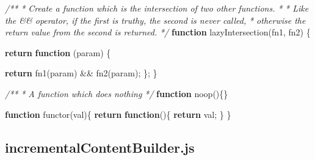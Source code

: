 \documentclass[12pt, ]{article}
\newenvironment{Shaded}{}{}
\newcommand{\KeywordTok}[1]{\textcolor[rgb]{0.00,0.44,0.13}{\textbf{{#1}}}}
\newcommand{\CommentTok}[1]{\textcolor[rgb]{0.38,0.63,0.69}{\textit{{#1}}}}
\newcommand{\FunctionTok}[1]{\textcolor[rgb]{0.02,0.16,0.49}{{#1}}}
\newcommand{\NormalTok}[1]{{#1}}
\begin{document}
\begin{Shaded}
\begin{Highlighting}[]
\CommentTok{/**}
\CommentTok{ * Create a function which is the intersection of two other functions.}
\CommentTok{ * }
\CommentTok{ * Like the && operator, if the first is truthy, the second is never called,}
\CommentTok{ * otherwise the return value from the second is returned.}
\CommentTok{ */}
\KeywordTok{function} \FunctionTok{lazyIntersection}\NormalTok{(fn1, fn2) \{}

   \KeywordTok{return} \KeywordTok{function} \NormalTok{(param) \{}
                                                              
      \KeywordTok{return} \FunctionTok{fn1}\NormalTok{(param) && }\FunctionTok{fn2}\NormalTok{(param);}
   \NormalTok{\};   }
\NormalTok{\}}

\CommentTok{/**}
\CommentTok{ * A function which does nothing}
\CommentTok{ */}
\KeywordTok{function} \FunctionTok{noop}\NormalTok{()\{\}}

\KeywordTok{function} \FunctionTok{functor}\NormalTok{(val)\{}
   \KeywordTok{return} \KeywordTok{function}\NormalTok{()\{}
      \KeywordTok{return} \NormalTok{val;}
   \NormalTok{\}}
\NormalTok{\}}
\end{Highlighting}
\end{Shaded}

\pagebreak

\subsection{incrementalContentBuilder.js}\label{headerux5fincrementalContentBuilder}

\label{src_incrementalContentBuilder}
\end{document}

